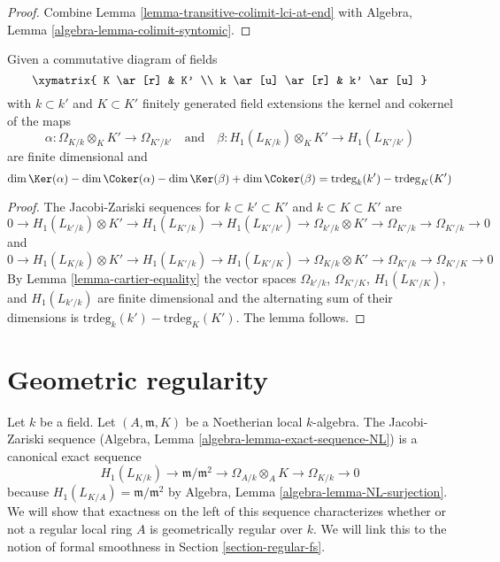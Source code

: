 \begin{proof}
Combine
Lemma \ref{lemma-transitive-colimit-lci-at-end}
with
Algebra, Lemma \ref{algebra-lemma-colimit-syntomic}.
\end{proof}

\begin{lemma}
\label{lemma-gamma-commutative-diagram}
Given a commutative diagram of fields
$$
\xymatrix{
K \ar[r] & K' \\
k \ar[u] \ar[r] & k' \ar[u]
}
$$
with $k \subset k'$ and $K \subset K'$ finitely generated field extensions
the kernel and cokernel of the maps
$$
\alpha : \Omega_{K/k} \otimes_K K' \to \Omega_{K'/k'}
\quad\text{and}\quad
\beta : H_1(L_{K/k}) \otimes_K K' \to H_1(L_{K'/k'})
$$
are finite dimensional and
$$
\dim \Ker(\alpha) - \dim \Coker(\alpha)
-\dim \Ker(\beta) + \dim \Coker(\beta)
=
\text{trdeg}_k(k') - \text{trdeg}_K(K')
$$
\end{lemma}

\begin{proof}
The Jacobi-Zariski sequences for $k \subset k' \subset K'$ and
$k \subset K \subset K'$ are
$$
0 \to H_1(L_{k'/k}) \otimes K'  \to
H_1(L_{K'/k}) \to
H_1(L_{K'/k'}) \to
\Omega_{k'/k} \otimes K' \to
\Omega_{K'/k} \to
\Omega_{K'/k} \to 0
$$
and
$$
0 \to H_1(L_{K/k}) \otimes K' \to
H_1(L_{K'/k}) \to
H_1(L_{K'/K}) \to
\Omega_{K/k} \otimes K' \to
\Omega_{K'/k} \to
\Omega_{K'/K} \to 0
$$
By
Lemma \ref{lemma-cartier-equality}
the vector spaces $\Omega_{k'/k}$, $\Omega_{K'/K}$, $H_1(L_{K'/K})$, and
$H_1(L_{k'/k})$ are finite dimensional and the alternating sum of their
dimensions is $\text{trdeg}_k(k') - \text{trdeg}_K(K')$.
The lemma follows.
\end{proof}





\section{Geometric regularity}
\label{section-geometrically-regular}

\noindent
Let $k$ be a field. Let $(A, \mathfrak m, K)$ be a Noetherian local
$k$-algebra. The Jacobi-Zariski sequence
(Algebra, Lemma \ref{algebra-lemma-exact-sequence-NL})
is a canonical exact sequence
$$
H_1(L_{K/k}) \to \mathfrak m/\mathfrak m^2 \to \Omega_{A/k} \otimes_A K \to
\Omega_{K/k} \to 0
$$
because $H_1(L_{K/A}) = \mathfrak m/\mathfrak m^2$ by
Algebra, Lemma \ref{algebra-lemma-NL-surjection}.
We will show that exactness on the left of this sequence characterizes
whether or not a regular local ring $A$ is geometrically regular over $k$.
We will link this to the notion of formal smoothness in
Section \ref{section-regular-fs}.

